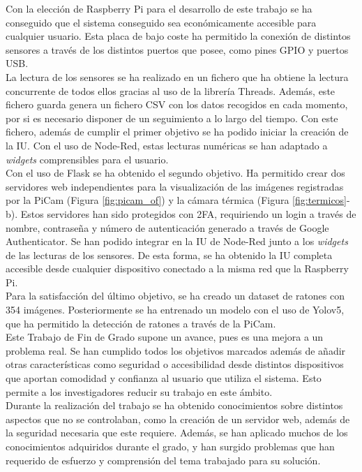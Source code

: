 Con la elección de Raspberry Pi para el desarrollo de este trabajo se ha conseguido que el sistema conseguido sea económicamente accesible para cualquier usuario. Esta placa de bajo coste ha permitido la conexión de distintos sensores a través de los distintos puertos que posee, como pines GPIO y puertos USB.\\

La lectura de los sensores se ha realizado en un fichero que ha obtiene la lectura concurrente de todos ellos gracias al uso de la librería Threads. Además, este fichero guarda genera un fichero CSV con los datos recogidos en cada momento, por si es necesario disponer de un seguimiento a lo largo del tiempo. Con este fichero, además de cumplir el primer objetivo se ha podido iniciar la creación de la IU. Con el uso de Node-Red, estas lecturas numéricas se han adaptado a \textit{widgets} comprensibles para el usuario.\\

Con el uso de Flask se ha obtenido el segundo objetivo. Ha permitido crear dos servidores web independientes para la visualización de las imágenes registradas por la PiCam (Figura \ref{fig:picam_of}) y la cámara térmica (Figura \ref{fig:termicos}-b). Estos servidores han sido protegidos con 2FA, requiriendo un login a través de nombre, contraseña y número de autenticación generado a través de Google Authenticator. Se han podido integrar en la IU de Node-Red junto a los \textit{widgets} de las lecturas de los sensores. De esta forma, se ha obtenido la IU completa accesible desde cualquier dispositivo conectado a la misma red que la Raspberry Pi.\\

Para la satisfacción del último objetivo, se ha creado un dataset de ratones con 354 imágenes. Posteriormente se ha entrenado un modelo con el uso de Yolov5, que ha permitido la detección de ratones a través de la PiCam.\\

Este Trabajo de Fin de Grado supone un avance, pues es una mejora a un problema real. Se han cumplido todos los objetivos marcados además de añadir otras características como seguridad o accesibilidad desde distintos dispositivos que aportan comodidad y confianza al usuario que utiliza el sistema. Esto permite a los investigadores reducir su trabajo en este ámbito.\\

Durante la realización del trabajo se ha obtenido conocimientos sobre distintos aspectos que no se controlaban, como la creación de un servidor web, además de la seguridad necesaria que este requiere. Además, se han aplicado muchos de los conocimientos adquiridos durante el grado, y han surgido problemas que han requerido de esfuerzo y comprensión del tema trabajado para su solución.\\

